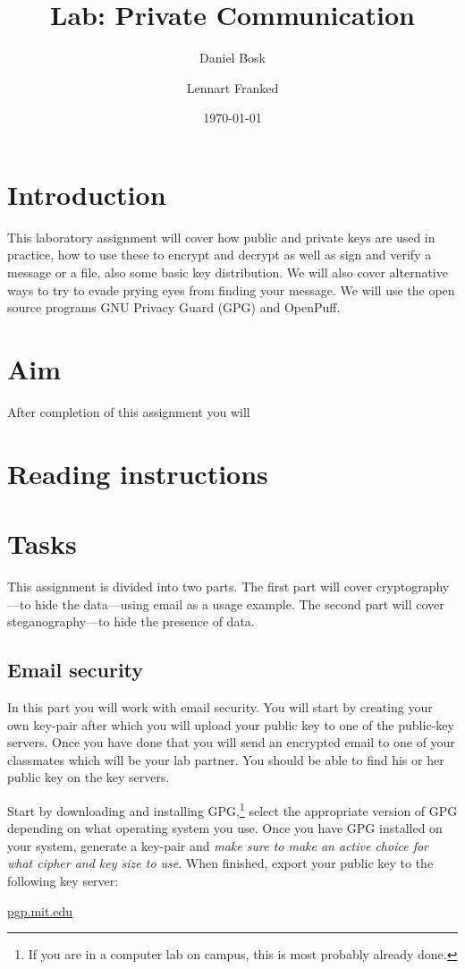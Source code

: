 \documentclass[a4paper]{llncs}
\title{Lab: Private Communication}
\author{%
  Daniel Bosk
  \and
  Lennart Franked
}
\institute{%
  Department of Information and Communication Systems\\
  Mid Sweden University, Sundsvall\\
  \email{\{daniel.bosk,lennart.franked\}@miun.se}
}
\date{\today}
\begin{document}
\maketitle


\section{Introduction}
\label{Introduction}
This laboratory assignment will cover how public and private keys are used in 
practice, how to use these to encrypt and decrypt as well as sign and verify 
a message or a file, also some basic key distribution.
We will also cover alternative ways to try to evade prying eyes from finding
your message.
We will use the open source programs GNU Privacy Guard (GPG) and OpenPuff.


\section{Aim}
\label{sec:Aim}
After completion of this assignment you will
\begin{itemize}
    
\end{itemize}


\section{Reading instructions}
\label{sec:Reading}



\section{Tasks}
\label{sec:Tasks}
This assignment is divided into two parts.
The first part will cover cryptography---to hide the data---using email as 
a usage example.
The second part will cover steganography---to hide the presence of data.

\subsection{Email security}
\label{subsec:Email}
In this part you will work with email security.
You will start by creating your own key-pair after which you will upload your 
public key to one of the public-key servers.
Once you have done that you will send an encrypted email to one of your
classmates which will be your lab partner.
You should be able to find his or her public key on the key servers.

Start by downloading and installing GPG,\footnote{%
  If you are in a computer lab on campus, this is most probably already done.
} select the appropriate version of GPG depending on what operating system you 
use.
Once you have GPG installed on your system, generate a key-pair and \emph{make 
sure to make an active choice for what cipher and key size to use}.
When finished, export your public key to the following key server:
\begin{center}
  \url{pgp.mit.edu}
\end{center}
\end{document}
